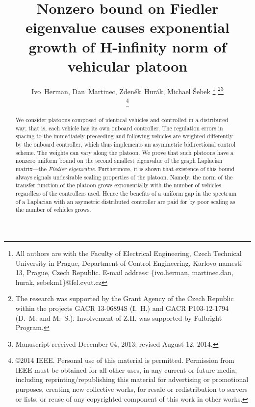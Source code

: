 \documentclass[technote, 10pt, twoside]{IEEEtran}
\theoremstyle{plain}
\theoremstyle{definition}
\theoremstyle{assump}
\begin{document}
\title{Nonzero bound on Fiedler eigenvalue causes exponential growth of
H-infinity norm of vehicular platoon}


\author{Ivo~Herman, Dan~Martinec,
        Zden\v{e}k~Hur\'{a}k, Michael \v{S}ebek
\thanks{All authors are with the Faculty of Electrical Engineering, Czech
Technical University in Prague, Department of Control Engineering, Karlovo
namesti 13, Prague, Czech Republic.
E-mail address:
\{ivo.herman, martinec.dan, hurak, sebekm1\}@fel.cvut.cz} \thanks{The research
was supported by the Grant Agency of the Czech Republic within the projects GACR 13-06894S (I.~H.) and GACR P103-12-1794 (D.~M. and M.~S.). Involvement of Z.H. was supported by Fulbright Program.
}\thanks{Manuscript received December 04, 2013; revised August 12, 2014.}

\thanks{\copyright 2014 IEEE. Personal use of this material is permitted.
Permission from IEEE must be obtained for all other uses, in any current or future media, including reprinting/republishing this material for advertising or promotional purposes, creating new collective works, for resale or redistribution to servers or lists, or reuse of any copyrighted component of this work in other works.}}
  
 


\maketitle

\begin{abstract} 
We consider platoons composed of identical vehicles and controlled in a
distributed way, that is, each vehicle has its own onboard controller. The
regulation errors in spacing to the immediately preceeding and following
vehicles are weighted differently by the onboard controller, which thus implements an
asymmetric bidirectional control scheme. The weights can vary along the platoon.
We prove that such platoons have a nonzero uniform bound on the second smallest
eigenvalue of the graph Laplacian matrix---the \textit{Fiedler eigenvalue}.
Furthermore, it is shown that existence of this bound always signals undesirable
scaling properties of the platoon. Namely, the  norm of the
transfer function of the platoon grows exponentially with the number of vehicles
regardless of the controllers used.
Hence the benefits of a uniform gap in the spectrum of a Laplacian with an
asymetric distributed controller 
are paid for by
poor scaling as the number of vehicles grows.
\end{abstract}
\end{document}
